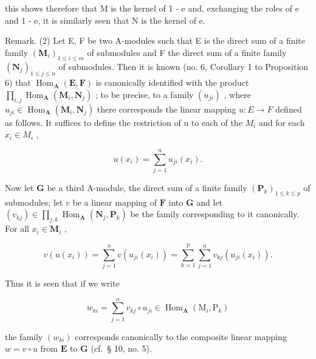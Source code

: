 this shows therefore that M is the kernel of 1 - e and, exchanging the roles of e and 1 - e, it is similarly seen that N is the kernel of e.

Remark. (2) Let E, F be two A-modules such that E is the direct sum of a finite family \((\mathbf{M}_{i})_{1\leqslant i\leqslant m}\) of submodules and F the direct sum of a finite family \((\mathbf{N}_{j})_{1\leqslant j\leqslant n}\) of submodules. Then it is known (no. 6, Corollary 1 to Proposition 6) that \(\operatorname{Hom}_{\mathbf{A}}(\mathbf{E},\mathbf{F})\) is canonically identified with the product \(\prod_{i,j}\operatorname{Hom}_{\mathbf{A}}(\mathbf{M}_{i},\mathbf{N}_{j})\) ; to be precise, to a family \((u_{ji})\) , where \(u_{ji}\in\operatorname{Hom}_{\mathbf{A}}(\mathbf{M}_{i},\mathbf{N}_{j})\) there corresponds the linear mapping \(u:E\to F\) defined as follows. It suffices to define the restriction of u to each of the \(M_{i}\) and for each \(x_{i}\in M_{i}\) ,

\[
u (x _ {i}) = \sum_ {j = 1} ^ {n} u _ {j i} (x _ {i}).
\]

Now let \(\mathbf{G}\) be a third A-module, the direct sum of a finite family \((\mathbf{P}_k)_{1 \leqslant k \leqslant p}\) of submodules; let \(v\) be a linear mapping of \(\mathbf{F}\) into \(\mathbf{G}\) and let \((v_{kj}) \in \prod_{j,k} \operatorname{Hom}_{\mathbf{A}}(\mathbf{N}_j, \mathbf{P}_k)\) be the family corresponding to it canonically. For all \(x_i \in \mathbf{M}_i\) ,

\[
v (u (x _ {i})) = \sum_ {j = 1} ^ {n} v (u _ {j i} (x _ {i})) = \sum_ {k = 1} ^ {p} \sum_ {j = 1} ^ {n} v _ {k j} (u _ {j i} (x _ {i})).
\]

Thus it is seen that if we write

\[
w _ {k i} = \sum_ {j = 1} ^ {n} v _ {k j} \circ u _ {j i} \in \operatorname{Hom} _ {\mathbf {A}} (\mathrm{M} _ {i}, \mathrm{P} _ {k})\tag{32}
\]

the family \((w_{ki})\) corresponds canonically to the composite linear mapping \(w = v \circ u\) from \(\mathbf{E}\) to \(\mathbf{G}\) (cf.~§ 10, no. 5).


